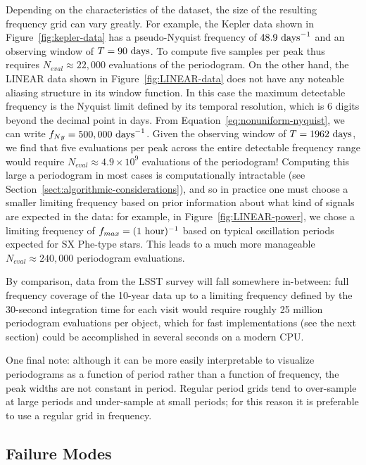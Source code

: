 \documentclass[preprint]{aastex}
\newcommand{\fig}[1]{Figure~\ref{fig:#1}}
\newcommand{\Eq}[1]{Equation~\ref{eq:#1}}
\newcommand{\eq}[1]{\Eq{#1}}
\newcommand{\Sect}[1]{Section~\ref{sect:#1}}
\newcommand{\sect}[1]{\Sect{#1}}
\newcommand{\sectlabel}[1]{\label{sect:#1}}
\begin{document}
Depending on the characteristics of the dataset, the size of the resulting
frequency grid can vary greatly.
For example, the Kepler data shown in \fig{kepler-data} has a pseudo-Nyquist
frequency of $48.9\ {\rm days}^{-1}$ and
an observing window of $T = 90\ {\rm days}$.
To compute five samples per peak thus requires $N_{eval} \approx 22,000$
evaluations of the periodogram.
On the other hand, the LINEAR data shown in \fig{LINEAR-data} does not have
any noteable aliasing structure in its window function.
In this case the maximum detectable frequency is the Nyquist limit defined
by its temporal resolution, which is 6 digits beyond the decimal point in days.
From \eq{nonuniform-nyquist}, we can write $f_{Ny} = 500,000\ {\rm days}^{-1}$.
Given the observing window of $T = 1962\ {\rm days}$, we find that five
evaluations per peak across the entire detectable frequency range
would require $N_{eval} \approx 4.9 \times 10^9$ evaluations of the periodogram!
Computing this large a periodogram in most cases is computationally intractable
(see \sect{algorithmic-considerations}), and so in practice one must choose
a smaller limiting frequency based on prior information about what kind of
signals are expected in the data: for example, in \fig{LINEAR-power}, we chose
a limiting frequency of $f_{max} = (1\ {\rm hour})^{-1}$ based on typical
oscillation periods expected for SX Phe-type stars.
This leads to a much more manageable
$N_{eval} \approx 240,000$ periodogram evaluations.

By comparison, data from the LSST survey \citep{Ivezic08LSST}
will fall somewhere in-between: full frequency coverage of
the 10-year data up to a limiting frequency defined by the 30-second
integration time for each visit would require roughly 25 million
periodogram evaluations per object, which for fast implementations
(see the next section) could be accomplished in several seconds on
a modern CPU.

One final note: although it can be more easily interpretable to
visualize periodograms as a function of period rather than a function of
frequency, the peak widths are not constant in period.
Regular period grids tend to over-sample at large periods and under-sample
at small periods;
for this reason it is preferable to use a regular grid in frequency.


\subsection{Failure Modes}
\sectlabel{failure-modes}
\end{document}
